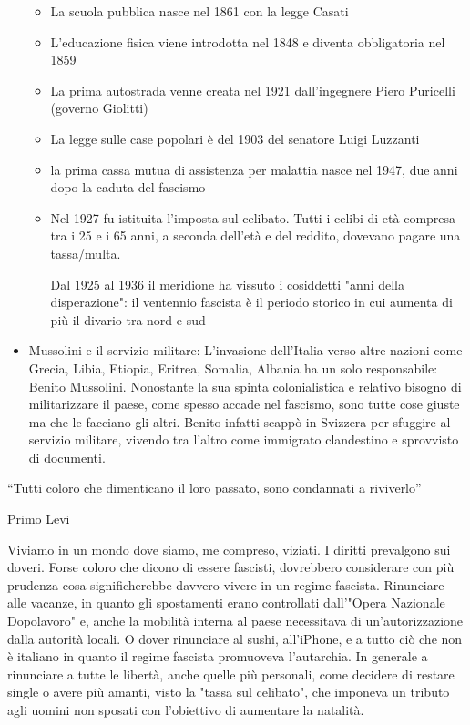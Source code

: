 \documentclass[12pt]{book} %
\begin{document}
\begin{mdframed}[linewidth=1pt]
\begin{itemize}
\begin{itemize}
\item La scuola pubblica nasce nel 1861 con la legge Casati 
\item L'educazione fisica viene introdotta nel 1848 e diventa obbligatoria nel 1859 
\item La prima autostrada venne creata nel 1921 dall'ingegnere Piero Puricelli (governo Giolitti)
\item La legge sulle case popolari è del 1903 del senatore Luigi Luzzanti
\item la prima cassa mutua di assistenza per malattia nasce nel 1947, due anni dopo la caduta del fascismo
\item Nel 1927 fu istituita l'imposta sul celibato. Tutti i celibi di età compresa tra i 25 e i 65 anni, a seconda
dell'età e del reddito, dovevano pagare una tassa/multa.

Dal 1925 al 1936 il meridione ha vissuto i cosiddetti "anni della disperazione": il
ventennio fascista è il periodo storico in cui aumenta di più il divario tra nord e sud
\end{itemize}
\item Mussolini e il servizio militare: L'invasione dell'Italia verso altre
nazioni come Grecia, Libia, Etiopia, Eritrea, Somalia, Albania ha un solo responsabile: Benito Mussolini. Nonostante la
sua spinta colonialistica e relativo bisogno di militarizzare il paese, come spesso accade nel fascismo, sono tutte
cose giuste ma che le facciano gli altri. Benito infatti scappò in Svizzera per sfuggire al servizio militare, vivendo
tra l'altro come immigrato clandestino e sprovvisto di documenti.
\end{itemize}
“Tutti coloro che dimenticano il loro passato, sono condannati a riviverlo”

Primo Levi

Viviamo in un mondo dove siamo, me compreso, viziati. I diritti prevalgono sui doveri. Forse coloro che dicono di essere fascisti, dovrebbero considerare con più prudenza cosa significherebbe davvero vivere in un regime fascista. Rinunciare alle vacanze, in quanto gli spostamenti erano controllati dall'"Opera Nazionale Dopolavoro" e, anche la mobilità interna al paese necessitava di un'autorizzazione dalla autorità locali. O dover rinunciare al sushi, all'iPhone, e a tutto ciò che non è italiano in quanto il regime fascista promuoveva l'autarchia. In generale a rinunciare a tutte le libertà, anche quelle più personali, come decidere di restare single o avere più amanti, visto la "tassa sul celibato", che imponeva un tributo agli uomini non sposati con l'obiettivo di aumentare la natalità.


\end{mdframed}
\end{document}
